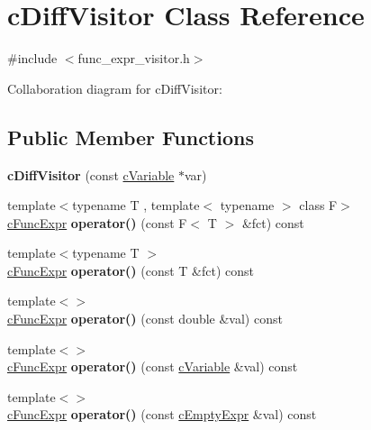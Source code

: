 \hypertarget{classcDiffVisitor}{\section{c\-Diff\-Visitor Class Reference}
\label{classcDiffVisitor}
}


{\ttfamily \#include $<$func\-\_\-expr\-\_\-visitor.\-h$>$}



Collaboration diagram for c\-Diff\-Visitor\-:
\subsection*{Public Member Functions}
\begin{DoxyCompactItemize}
\item 
\hypertarget{classcDiffVisitor_a249285ff280fc007121521a804e099a1}{{\bfseries c\-Diff\-Visitor} (const \hyperlink{classcVariable}{c\-Variable} $\ast$var)}\label{classcDiffVisitor_a249285ff280fc007121521a804e099a1}

\item 
\hypertarget{classcDiffVisitor_a4b3be8c749f3555638a8dad74ea81683}{{\footnotesize template$<$typename T , template$<$ typename $>$ class F$>$ }\\\hyperlink{classcFuncExpr}{c\-Func\-Expr} {\bfseries operator()} (const F$<$ T $>$ \&fct) const }\label{classcDiffVisitor_a4b3be8c749f3555638a8dad74ea81683}

\item 
\hypertarget{classcDiffVisitor_ae9ef5b0113ad5e7a12cbc2336ef0a393}{{\footnotesize template$<$typename T $>$ }\\\hyperlink{classcFuncExpr}{c\-Func\-Expr} {\bfseries operator()} (const T \&fct) const }\label{classcDiffVisitor_ae9ef5b0113ad5e7a12cbc2336ef0a393}

\item 
\hypertarget{classcDiffVisitor_af3d1042e67043efa599d85a3be714296}{{\footnotesize template$<$$>$ }\\\hyperlink{classcFuncExpr}{c\-Func\-Expr} {\bfseries operator()} (const double \&val) const }\label{classcDiffVisitor_af3d1042e67043efa599d85a3be714296}

\item 
\hypertarget{classcDiffVisitor_a55fd405ce489753eea01fca28b104df5}{{\footnotesize template$<$$>$ }\\\hyperlink{classcFuncExpr}{c\-Func\-Expr} {\bfseries operator()} (const \hyperlink{classcVariable}{c\-Variable} \&val) const }\label{classcDiffVisitor_a55fd405ce489753eea01fca28b104df5}

\item 
\hypertarget{classcDiffVisitor_ae7d3209aa1bb8a11858c360fb9d7b695}{{\footnotesize template$<$$>$ }\\\hyperlink{classcFuncExpr}{c\-Func\-Expr} {\bfseries operator()} (const \hyperlink{structcEmptyExpr}{c\-Empty\-Expr} \&val) const }\label{classcDiffVisitor_ae7d3209aa1bb8a11858c360fb9d7b695}

\end{DoxyCompactItemize}
